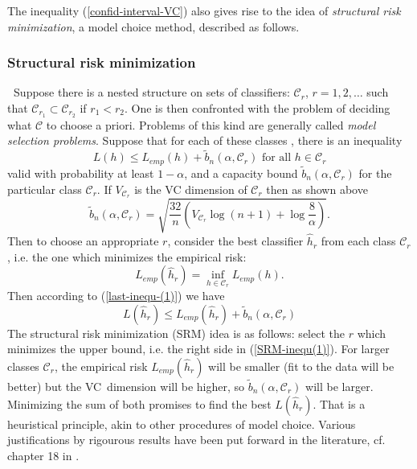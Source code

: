 \documentclass[11pt,twoside]{article}%
\theoremstyle{change}
\begin{document}
The inequality (\ref{confid-interval-VC}) also gives rise to the idea of
\textit{structural risk minimization}, a model choice method, described as follows.

\bigskip

\subsubsection{Structural risk minimization}

\textbf{\ }Suppose there is a nested structure on sets of classifiers:
$\mathcal{C}_{r}$, $r=1,2,\ldots$ such that $\mathcal{C}_{r_{1}}%
\subset\mathcal{C}_{r_{2}}$ if $r_{1}<r_{2}$. One is then confronted with the
problem of deciding what $\mathcal{C}$ to choose a priori. Problems of this
kind are generally called \textit{model selection problems}. Suppose that for
each of these classes , there is an inequality
\begin{equation}
L(h)\leq L_{emp}(h)+\tilde{b}_{n}(\alpha,\mathcal{C}_{r})\text{ for all }%
h\in\mathcal{C}_{r}\label{last-inequ-(1)}%
\end{equation}
valid with probability at least $1-\alpha$, and a capacity bound $\tilde
{b}_{n}(\alpha,\mathcal{C}_{r})$ for the particular class $\mathcal{C}_{r}$.
If $V_{\mathcal{C}_{r}}$ is the VC dimension of $\mathcal{C}_{r}$ then as
shown above
\[
\tilde{b}_{n}(\alpha,\mathcal{C}_{r})=\sqrt{\frac{32}{n}\left(  V_{\mathcal{C}%
_{r}}\log(n+1)+\log\frac{8}{\alpha}\right)  }.
\]
Then to choose an appropriate $r$, consider the best classifier $\hat{h}_{r}$
from each class $\mathcal{C}_{r}$, i.e. the one which minimizes the empirical
risk:%
\[
L_{emp}(\hat{h}_{r})=\inf_{h\in\mathcal{C}_{r}}L_{emp}(h).
\]
Then according to (\ref{last-inequ-(1)}) we have
\begin{equation}
L(\hat{h}_{r})\leq L_{emp}(\hat{h}_{r})+\tilde{b}_{n}(\alpha,\mathcal{C}%
_{r})\label{SRM-inequ(1)}%
\end{equation}
The structural risk minimization (SRM) idea is as follows: select the $r$
which minimizes the upper bound, i.e. the right side in (\ref{SRM-inequ(1)}).
For larger classes $\mathcal{C}_{r}$, the empirical risk $L_{emp}(\hat{h}%
_{r})$ will be smaller (fit to the data will be better) but the VC\ dimension
will be higher, so $\tilde{b}_{n}(\alpha,\mathcal{C}_{r})$ will be larger.
Minimizing the sum of both promises to find the best $L(\hat{h}_{r})$. That is
a heuristical principle, akin to other procedures of model choice. Various
justifications by rigourous results have been put forward in the literature,
cf. chapter 18 in \cite{DGL}.%
\end{document}

